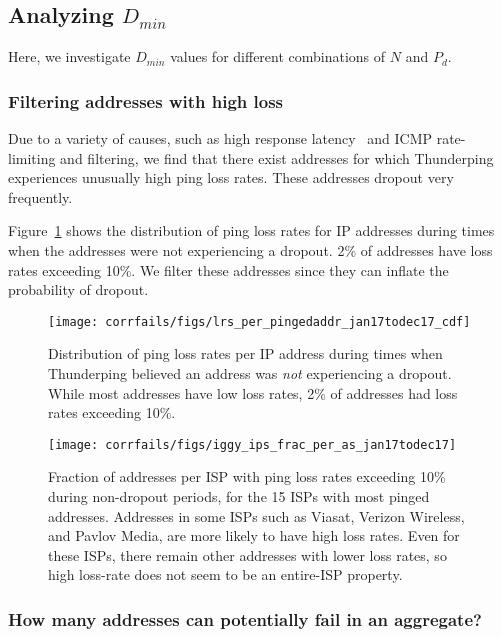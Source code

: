 \subsection{Analyzing $D_{min}$}


Here, we investigate $D_{min}$ values for different combinations of
$N$ and $P_d$.

\subsubsection*{Filtering addresses with high loss}

Due to a variety of causes, such as high response
latency~\cite{timeouts} and ICMP rate-limiting and filtering, we find
that there exist addresses for which Thunderping experiences unusually high
ping loss rates. These addresses dropout very
frequently. 

Figure~\ref{fig:lrs_per_pingedaddr} shows the distribution of ping
loss rates for IP addresses during times when the addresses were not
experiencing a dropout. 2\% of addresses have loss rates exceeding
10\%. We filter these addresses since they can inflate the probability
of dropout.

\begin{figure}[t]
\centering
\texttt{[image: corrfails/figs/lrs\_per\_pingedaddr\_jan17todec17\_cdf]}
\caption{
\label{fig:lrs_per_pingedaddr}
Distribution of ping loss rates per IP address during times when Thunderping believed an
address was \emph{not} experiencing a dropout. While most addresses
have low loss rates, 2\% of addresses had loss rates exceeding 10\%.}
\end{figure}

\begin{figure}[t]
\centering
\texttt{[image: corrfails/figs/iggy\_ips\_frac\_per\_as\_jan17todec17]}
\caption{
\label{fig:iggy_ips_frac_per_as}
Fraction of addresses per ISP with ping loss rates exceeding 10\%
during non-dropout periods, for the 15 ISPs with most pinged
addresses. Addresses in some ISPs such as Viasat, Verizon Wireless, and Pavlov
Media, are more likely to have high loss rates. Even for these ISPs,
there remain other addresses with lower loss rates, so high loss-rate does not seem
to be an entire-ISP property.}
\end{figure}


\subsubsection*{How many addresses can potentially fail in an
  aggregate?} %

